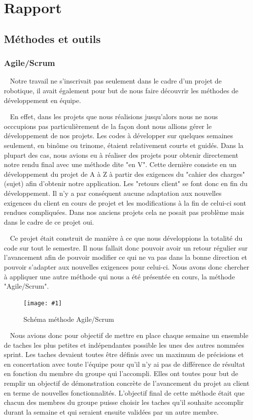 \documentclass[12pt]{article}
\def\tab{$\>\>\>\>$}
\newcommand\img[2]{
\begin{figure}[!h]
  \centering
    \texttt{[image: \#1]}
  \caption{#2}
  \label{img:#1}
\end{figure}
}
\begin{document}
\newpage
\section{Rapport}
\subsection{Méthodes et outils}
\subsubsection{Agile/Scrum}

\tab Notre travail ne s'inscrivait pas seulement dans le cadre d'un projet de robotique, il avait également pour but de nous faire découvrir les méthodes de développement en équipe.

\tab En effet, dans les projets que nous réalisions jusqu'alors nous ne nous occcupions pas particulièrement de la façon dont nous allions gérer le développement de nos projets. Les codes à développer sur quelques semaines seulement, en binôme ou trinome, étaient relativement courts et guidés. Dans la plupart des cas, nous avions eu à réaliser des projets pour obtenir directement notre rendu final avec une méthode dite "en V". Cette dernière consiste en un développement du projet de A à Z à partir des exigences du "cahier des charges" (sujet) afin d'obtenir notre application. Les "retours client" se font donc en fin du développement. Il n'y a par conséquent aucune adaptation aux nouvelles exigences du client en cours de projet et les modifications à la fin de celui-ci sont rendues compliquées. Dans nos anciens projets cela ne posait pas problème mais dans le cadre de ce projet oui.

\tab Ce projet était construit de manière à ce que nous développions la totalité du code sur tout le semestre. Il nous fallait donc pouvoir avoir un retour régulier sur l'avancement afin de pouvoir modifier ce qui ne va pas dans la bonne direction et pouvoir s'adapter aux nouvelles exigences pour celui-ci. Nous avons donc chercher à appliquer une autre méthode qui nous a été présentée en cours, la méthode "Agile/Scrum".

\img{Images/VueGlobaleScrum.png}{Schéma méthode Agile/Scrum}

\tab Nous avions donc pour objectif de mettre en place chaque semaine un ensemble de taches les plus petites et indépendantes possible les unes des autres nommées sprint. Les taches devaient toutes être définis avec un maximum de précisions et en concertation avec toute l'équipe pour qu'il n'y ai pas de différence de résultat en fonction du membre du groupe qui l'accompli. Elles ont toutes pour but de remplir un objectif de démonstration concrète de l'avancement du projet au client en terme de nouvelles fonctionnalités. L'objectif final de cette méthode était que chacun des membres du groupe puisse choisir les taches qu'il souhaite accomplir durant la semaine et qui seraient ensuite validées par un autre membre.
\end{document}
